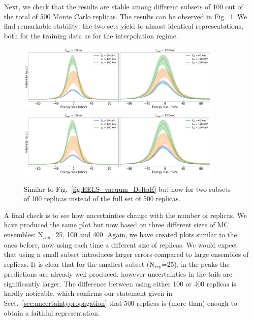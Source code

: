 Next, we check that the results are stable among different subsets of 100 out of the 
total of 500 Monte Carlo replicas. 
%
The results can be observed in Fig.~\ref{fig:EELS_vacuum_DeltaE_check2}.
%
We find remarkable stability: the two sets yield to almost identical representations,
both for the training data as for the interpolation regime. 
%
\begin{figure}[H]
\centering
 \includegraphics[width=0.9\textwidth]{plots/Prediction_120keV_100replicas_part1.pdf}
 \includegraphics[width=0.9\textwidth]{plots/Prediction_120keV_100replicas_part2.pdf}
 \caption{Similar to Fig.~\ref{fig:EELS_vacuum_DeltaE} but now for two subsets of 100 replicas
 instead of the full set of 500 replicas.
 }
\label{fig:EELS_vacuum_DeltaE_check2}
\end{figure}

A final check is to see how uncertainties change with the number of replicas. 
We have produced the same plot but now based on three different sizes of MC ensembles:
N$_{rep}$=25, 100 and 400. 
%
Again, we have created plots similar to the ones before, now using each time
a different size of replicas. 
%
We would expect that using a small subset introduces larger errors compared to 
large ensembles of replicas.
%
It is clear that for the smallest subset (N$_{rep}$=25), in the peaks the predictions are
already well produced, however uncertainties in the tails are significantly larger.
%
The difference between using either 100 or 400 replicas is hardly noticable, which
confirms our statement given in Sect.~\ref{sec:uncertaintypropagation} that 500
replicas is (more than) enough to obtain a faithful representation.

